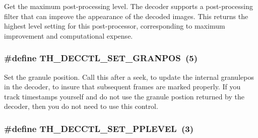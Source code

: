 Get the maximum post-\/processing level. The decoder supports a post-\/processing filter that can improve the appearance of the decoded images. This returns the highest level setting for this post-\/processor, corresponding to maximum improvement and computational expense. \hypertarget{group__oldfuncs_ga1e870c654d35394f0d490045df04e0f5}{
\subsubsection[{T\+H\+\_\+\+D\+E\+C\+C\+T\+L\+\_\+\+S\+E\+T\+\_\+\+G\+R\+A\+N\+P\+O\+S}]{\setlength{\rightskip}{0pt plus 5cm}\#define T\+H\+\_\+\+D\+E\+C\+C\+T\+L\+\_\+\+S\+E\+T\+\_\+\+G\+R\+A\+N\+P\+O\+S~(5)}}\label{group__oldfuncs_ga1e870c654d35394f0d490045df04e0f5}
Set the granule position. Call this after a seek, to update the internal granulepos in the decoder, to insure that subsequent frames are marked properly. If you track timestamps yourself and do not use the granule postion returned by the decoder, then you do not need to use this control. \hypertarget{group__oldfuncs_ga87774c35e1a755a84e2d705b38ebef0d}{
\subsubsection[{T\+H\+\_\+\+D\+E\+C\+C\+T\+L\+\_\+\+S\+E\+T\+\_\+\+P\+P\+L\+E\+V\+E\+L}]{\setlength{\rightskip}{0pt plus 5cm}\#define T\+H\+\_\+\+D\+E\+C\+C\+T\+L\+\_\+\+S\+E\+T\+\_\+\+P\+P\+L\+E\+V\+E\+L~(3)}}\label{group__oldfuncs_ga87774c35e1a755a84e2d705b38ebef0d}
